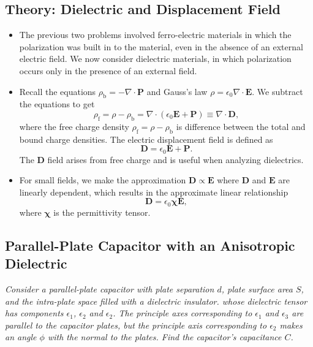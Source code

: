 \documentclass[11pt, a4paper]{article}
\renewcommand{\vec}[1]{\bm{#1}} %
\newcommand{\E}{\vec{E}}  %
\newcommand{\D}{\vec{D}}  %
\newcommand{\e}{\epsilon}
\newcommand{\ee}{\epsilon_{0}}  %
\newcommand{\eee}{\bm{\chi}}  %
\renewcommand{\P}{\vec{P}}  %
\renewcommand{\div}{\nabla \cdot}
\begin{document}
\subsection{Theory: Dielectric and Displacement Field}
\begin{itemize}
		\item The previous two problems involved ferro-electric materials in which the polarization was built in to the material, even in the absence of an external electric field. We now consider dielectric materials, in which polarization occurs only in the presence of an external field. 
		
		\item Recall the equations $ \rho_{\text{b}} = - \div \P $ and Gauss's law $ \rho = \ee \div \E $. We subtract the equations to get
		\begin{equation*}
			\rho_{\text{f}} = \rho - \rho_{\text{b}} = \div (\ee \E + \P) \equiv \div \D,
		\end{equation*}
		where the free charge density $ \rho_{\text{f}} = \rho - \rho_{\text{b}} $ is difference between the total and bound charge densities. The electric displacement field is defined as
		\begin{equation*}
			\D = \ee \E + \P.
		\end{equation*}
		The $ \D $ field arises from free charge and is useful when analyzing dielectrics.
		
		\item For small fields, we make the approximation $ \D \propto \E $ where $ \D $ and $ \E $ are linearly dependent, which results in the approximate linear relationship 
		\begin{equation*}
			\D = \ee \eee \E,
		\end{equation*}
		where $ \eee $ is the permittivity tensor.
\end{itemize}

\subsection{Parallel-Plate Capacitor with an Anisotropic Dielectric}
\textit{Consider a parallel-plate capacitor with plate separation $ d $, plate surface area $ S $, and the intra-plate space filled with a dielectric insulator. whose dielectric tensor has components $ \e_{1} $, $ \e_{2} $ and $ \e_{2} $. The principle axes corresponding to $ \e_{1} $ and $ \e_{3} $ are parallel to the capacitor plates, but the principle axis corresponding to $ \e_{2} $ makes an angle $ \phi $ with the normal to the plates. Find the capacitor's capacitance $ C $.}
\end{document}
